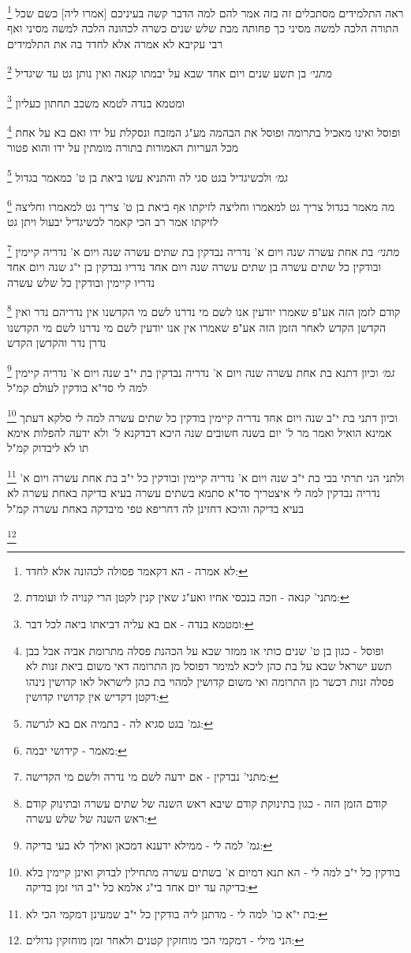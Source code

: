 \documentclass[12pt, openany]{book}
\newcommand{\footnotecomment}[1]{
	\renewcommand\thefootnote{}
	\footnote{#1}}
\newcommand{\commenta}[1]{\footnotecomment{#1}}
\begin{document}
{{\commenta{לא אמרה - הא דקאמר פסולה לכהונה אלא לחדד:}
ראה התלמידים מסתכלים זה בזה אמר להם למה הדבר קשה בעיניכם [אמרו ליה] כשם שכל התורה הלכה למשה מסיני כך פחותה מבת שלש שנים כשרה לכהונה הלכה למשה מסיני ואף רבי עקיבא לא אמרה אלא לחדד בה את התלמידים
\commenta{מתני' קנאה - וזכה בנכסי אחיו ואע"ג שאין קנין לקטן הרי קנויה לו ועומדת:}
{\large\emph{מתני׳}} בן תשע שנים ויום אחד שבא על יבמתו קנאה ואין נותן גט עד שיגדיל
\commenta{ומטמא בנדה - אם בא עליה דביאתו ביאה לכל דבר:}
ומטמא בנדה לטמא משכב תחתון כעליון 
\commenta{ופוסל - כגון בן ט' שנים כותי או ממזר שבא על הכהנת פסלה מתרומת אביה אבל בבן תשע ישראל שבא על בת כהן ליכא למימר דפוסל מן התרומה דאי משום ביאת זנות לא פסלה זנות דכשר מן התרומה ואי משום קדושין למהוי בת כהן לישראל לאו קדושין נינהו דקטן דקדיש אין קדושיו קדושין:}
ופוסל ואינו מאכיל בתרומה ופוסל את הבהמה מע"ג המזבח ונסקלת על ידו ואם בא על אחת מכל העריות האמורות בתורה מומתין על ידו והוא פטור
\commenta{גמ' בגט סגיא לה - בתמיה אם בא לגרשה:}
{\large\emph{גמ׳}} ולכשיגדיל בגט סגי לה והתניא עשו ביאת בן ט' כמאמר בגדול
\commenta{מאמר - קידושי יבמה:}
מה מאמר בגדול צריך גט למאמרו וחליצה לזיקתו אף ביאת בן ט' צריך גט למאמרו וחליצה לזיקתו 
אמר רב הכי קאמר
לכשיגדיל יבעול ויתן גט
\commenta{מתני' נבדקין - אם ידעה לשם מי נדרה ולשם מי הקדישה:
}
{\large\emph{מתני׳}} בת אחת עשרה שנה ויום א' נדריה נבדקין בת שתים עשרה שנה ויום א' נדריה קיימין ובודקין כל שתים עשרה
בן שתים עשרה שנה ויום אחד נדריו נבדקין בן י"ג שנה ויום אחד נדריו קיימין ובודקין כל שלש עשרה 
\commenta{קודם הזמן הזה - כגון בתינוקת קודם שיבא ראש השנה של שתים עשרה ובתינוק קודם ראש השנה של שלש עשרה:}
קודם לזמן הזה אע"פ שאמרו יודעין אנו לשם מי נדרנו לשם מי הקדשנו אין נדריהם נדר ואין הקדשן הקדש לאחר הזמן הזה אע"פ שאמרו אין אנו יודעין לשם מי נדרנו לשם מי הקדשנו נדרן נדר והקדשן הקדש
\commenta{גמ' למה לי - ממילא ידענא דמכאן ואילך לא בעי בדיקה:}
{\large\emph{גמ׳}} וכיון דתנא בת אחת עשרה שנה ויום א' נדריה נבדקין בת י"ב שנה ויום א' נדריה קיימין למה לי סד"א בודקין לעולם קמ"ל 
\commenta{בודקין כל י"ב למה לי - הא תנא דמיום א' בשתים עשרה מתחילין לבדוק ואינן קיימין בלא בדיקה עד יום אחד בי"ג אלמא כל י"ב הוי זמן בדיקה:}
וכיון דתני בת י"ב שנה ויום אחד נדריה קיימין בודקין כל שתים עשרה למה לי סלקא דעתך אמינא הואיל ואמר מר ל' יום בשנה חשובים שנה היכא דבדקנא ל' ולא ידעה להפלות אימא תו לא ליבדוק קמ"ל 
\commenta{בת י"א כו' למה לי - מדתנן ליה בודקין כל י"ב שמעינן דמקמי הכי לא:}
ולתני הני תרתי בבי בת י"ב שנה ויום א' נדריה קיימין ובודקין כל י"ב בת אחת עשרה ויום א' נדריה נבדקין למה לי 
איצטריך סד"א סתמא בשתים עשרה בעיא בדיקה באחת עשרה לא בעיא בדיקה והיכא דחזינן לה דחריפא טפי מיבדקה באחת עשרה קמ"ל 
\commenta{הני מילי - דמקמי הכי מוחזקין קטנים ולאחר זמן מוחזקין גדולים:}
}}
\end{document}
